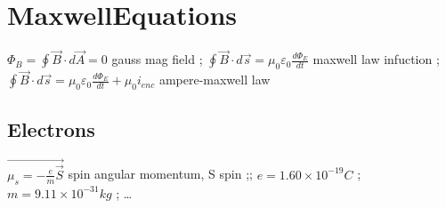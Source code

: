 \section{MaxwellEquations}
$\Phi _B=\oint \vec{B}\cdot d\vec{A}=0$ gauss mag field ;
$\oint \vec{B}\cdot d\vec{s}=\mu _0\varepsilon _0\frac{d\Phi _E}{dt}$ maxwell law infuction ;
$\oint \vec{B}\cdot d\vec{s}=\mu _0\varepsilon _0\frac{d\Phi _E}{dt}+\mu _0i_{enc}$ ampere-maxwell law \\
\subsection{Electrons}
$\vec{\mu _s=-\frac{e}{m}\vec{S}}$ spin angular momentum, S spin ;;
$e=1.60\times 10^{-19}C$ ;
$m=9.11\times 10^{-31}kg$ ; \dots